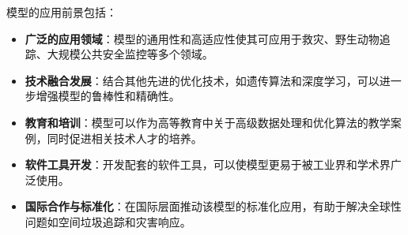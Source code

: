 \documentclass[withoutpreface,bwprint,12pt,a4paper]{cumcmthesis}
\begin{document}
模型的应用前景包括：

\begin{itemize}
    \item \textbf{广泛的应用领域}：模型的通用性和高适应性使其可应用于救灾、野生动物追踪、大规模公共安全监控等多个领域。
    \item \textbf{技术融合发展}：结合其他先进的优化技术，如遗传算法和深度学习，可以进一步增强模型的鲁棒性和精确性。
    \item \textbf{教育和培训}：模型可以作为高等教育中关于高级数据处理和优化算法的教学案例，同时促进相关技术人才的培养。
    \item \textbf{软件工具开发}：开发配套的软件工具，可以使模型更易于被工业界和学术界广泛使用。
    \item \textbf{国际合作与标准化}：在国际层面推动该模型的标准化应用，有助于解决全球性问题如空间垃圾追踪和灾害响应。
\end{itemize}
\end{document}
